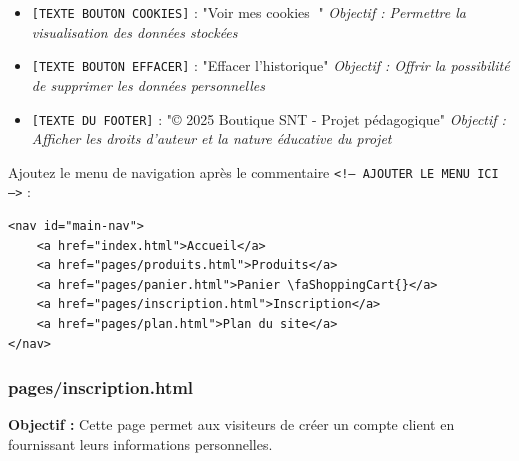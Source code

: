 \documentclass[12pt,a4paper]{article}
\begin{document}
\begin{itemize}
\item \texttt{[TEXTE BOUTON COOKIES]} : "Voir mes cookies 🍪" \newline \textit{Objectif : Permettre la visualisation des données stockées}
\item \texttt{[TEXTE BOUTON EFFACER]} : "Effacer l'historique" \newline \textit{Objectif : Offrir la possibilité de supprimer les données personnelles}
\item \texttt{[TEXTE DU FOOTER]} : "© 2025 Boutique SNT - Projet pédagogique" \newline \textit{Objectif : Afficher les droits d'auteur et la nature éducative du projet}
\end{itemize}

Ajoutez le menu de navigation après le commentaire \texttt{<!-- AJOUTER LE MENU ICI -->} :

\begin{lstlisting}
<nav id="main-nav">
    <a href="index.html">Accueil</a>
    <a href="pages/produits.html">Produits</a>
    <a href="pages/panier.html">Panier \faShoppingCart{}</a>
    <a href="pages/inscription.html">Inscription</a>
    <a href="pages/plan.html">Plan du site</a>
</nav>
\end{lstlisting}

\subsubsection{pages/inscription.html}

\textbf{Objectif :} Cette page permet aux visiteurs de créer un compte client en fournissant leurs informations personnelles.
\end{document}
